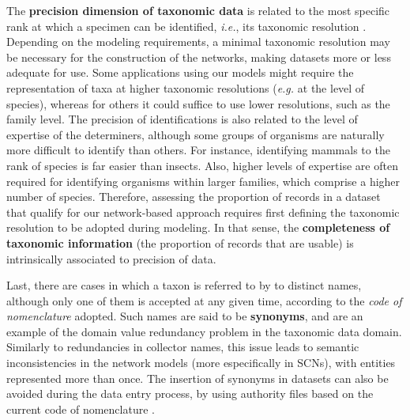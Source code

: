 The \textbf{precision dimension of taxonomic data} is related to the most specific rank at which a specimen can be identified, \textit{i.e.}, its taxonomic resolution \cite{Veiga2014}.
Depending on the modeling requirements, a minimal taxonomic resolution may be necessary for the construction of the networks, making datasets more or less adequate for use.
Some applications using our models might require the representation of taxa at higher taxonomic resolutions  (\textit{e.g.} at the level of species), whereas for others it could suffice to use lower resolutions, such as the family level.
The precision of identifications is also related to the level of expertise of the determiners, although some groups of organisms are naturally more difficult to identify than others.
For instance, identifying mammals to the rank of species is far easier than insects.
Also, higher levels of expertise are often required for identifying organisms within larger families, which comprise a higher number of species.
%
Therefore, assessing the proportion of records in a dataset that qualify for our network-based approach requires first defining the taxonomic resolution to be adopted during modeling.
In that sense, the \textbf{completeness of taxonomic information} (the proportion of records that are usable) is intrinsically associated to precision of data.

Last, there are cases in which a taxon is referred to by to distinct names, although only one of them is accepted at any given time, according to the \textit{code of nomenclature} adopted.
Such names are said to be \textbf{synonyms}, and are an example of the domain value redundancy problem in the taxonomic data domain.
Similarly to redundancies in collector names, this issue leads to semantic inconsistencies in the network models (more especifically in SCNs), with entities represented more than once.
The insertion of synonyms in datasets can also be avoided during the data entry process, by using authority files based on the current code of nomenclature \cite{Veiga2014}. 















